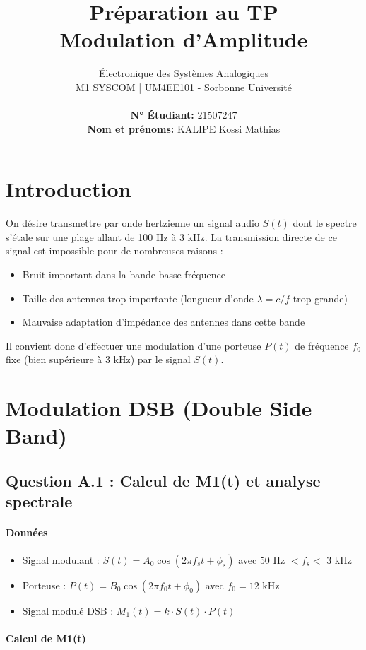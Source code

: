 \documentclass[11pt,a4paper]{article}
\title{\textbf{Préparation au TP\\Modulation d'Amplitude}}
\author{Électronique des Systèmes Analogiques\\M1 SYSCOM | UM4EE101 - Sorbonne Université \\ \\ \textbf{N° Étudiant:} 21507247 \\ \textbf{Nom et prénoms:} KALIPE Kossi Mathias}
\date{}
\begin{document}
\maketitle

\section*{Introduction}

On désire transmettre par onde hertzienne un signal audio $S(t)$ dont le spectre s'étale sur une plage allant de 100 Hz à 3 kHz. La transmission directe de ce signal est impossible pour de nombreuses raisons :
\begin{itemize}
    \item Bruit important dans la bande basse fréquence
    \item Taille des antennes trop importante (longueur d'onde $\lambda = c/f$ trop grande)
    \item Mauvaise adaptation d'impédance des antennes dans cette bande
\end{itemize}

Il convient donc d'effectuer une modulation d'une porteuse $P(t)$ de fréquence $f_0$ fixe (bien supérieure à 3 kHz) par le signal $S(t)$.

\section{Modulation DSB (Double Side Band)}

\subsection{Question A.1 : Calcul de M1(t) et analyse spectrale}

\paragraph{Données}
\begin{itemize}
    \item Signal modulant : $S(t) = A_0 \cos(2\pi f_s t + \phi_s)$ avec $50$ Hz $< f_s <$ 3 kHz
    \item Porteuse : $P(t) = B_0 \cos(2\pi f_0 t + \phi_0)$ avec $f_0 = 12$ kHz
    \item Signal modulé DSB : $M_1(t) = k \cdot S(t) \cdot P(t)$
\end{itemize}

\paragraph{Calcul de M1(t)}
\end{document}
